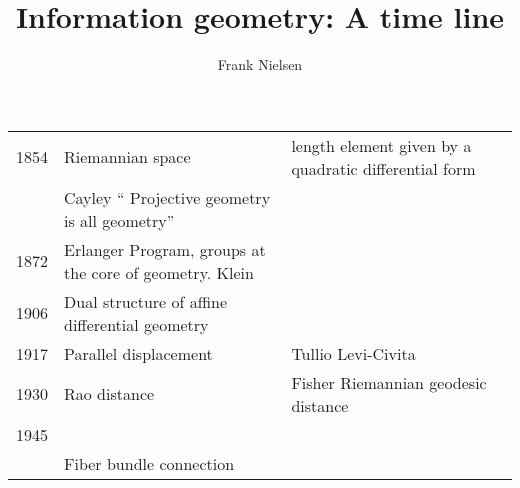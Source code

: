 \documentclass{article}
\title{Information geometry: A time line}
\author{Frank Nielsen}
\date{}
\begin{document}
\maketitle

\begin{longtable}{llll}
1854 & Riemannian space & length element given by a quadratic differential form\\
 & Cayley `` Projective geometry is all geometry''\\
1872 & Erlanger Program, groups at the core of geometry. Klein \\
1906 & Dual structure of affine differential geometry\\
1917 & Parallel displacement & Tullio Levi-Civita~\cite{LeviCivita-1916}\\
1930 & Rao distance & Fisher Riemannian geodesic distance\\
1945 & \\
 & Fiber bundle connection\\
\end{longtable}




\end{document}
